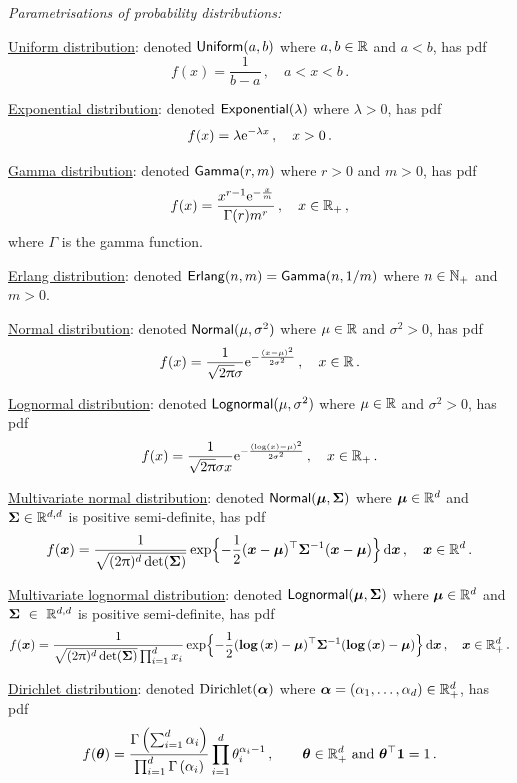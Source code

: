 \emph{Parametrisations of probability distributions:}

\underline{Uniform distribution}: denoted $\mathsf{Uniform}(a,b)$ where $a,b\in\mathbb{R}$ and $a < b$, has pdf
\[ f(x) = \frac{1}{b-a} \,, \quad  a < x < b \,. \]

\underline{Exponential distribution}: denoted $\mathsf{Exponential}(\lambda)$ where $\lambda > 0$, has pdf
\[ f(x) = \lambda \mathrm{e}^{-\lambda x} \,, \quad x > 0 \,. \]

\underline{Gamma distribution}: denoted $\mathsf{Gamma}(r,m)$ where $r > 0$ and $m > 0$, has pdf
\[ f(x) = \frac{x^{r-1}\mathrm{e}^{-\frac{x}{m}}}{\Gamma(r)m^{r}} \,, \quad x \in \mathbb{R}_+\,,\]
where $\Gamma$ is the gamma function.

\underline{Erlang distribution}: denoted $\mathsf{Erlang}(n, m) = \mathsf{Gamma}(n, 1/m)$ where $n \in \mathbb{N}_+$ and $m > 0$.

\underline{Normal distribution}: denoted $\mathsf{Normal}(\mu, \sigma^2)$ where $\mu \in \mathbb{R}$ and $\sigma^2 > 0$, has pdf
\[ f(x) = \frac{1}{\sqrt{2 \uppi} \sigma} \mathrm{e}^{-\frac{(x-\mu)^2}{2 \sigma^2}} \,, \quad x \in \mathbb{R} \,. \]

\underline{Lognormal distribution}: denoted $\mathsf{Lognormal}(\mu, \sigma^2)$ where $\mu \in \mathbb{R}$ and $\sigma^2 > 0$, has pdf
\[ f(x) = \frac{1}{\sqrt{2 \uppi} \sigma x} \mathrm{e}^{-\frac{(\log(x)-\mu)^2}{2 \sigma^2}} \,, \quad x \in \mathbb{R}_+ \,.  \]

\underline{Multivariate normal distribution}: denoted $\mathsf{Normal}(\bm{\mu}, \bm{\Sigma})$ where $\bm{\mu} \in \mathbb{R}^d$ and $\bm{\Sigma} \in \mathbb{R}^{d,d}$ is positive semi-definite, has pdf
\[
  f(\bm{x}) = \frac{1}{\sqrt{(2\uppi)^d \det(\bm{\Sigma})}} \exp\Bigl\{ {-}\frac12 (\bm{x} - \bm{\mu})^\top \bm{\Sigma}^{-1} (\bm{x} - \bm{\mu}) \Bigr\} \mathop{}\!\mathrm{d} \bm{x} \,, \quad \bm{x} \in \mathbb{R}^d \,.
\]

\underline{Multivariate lognormal distribution}: denoted $\mathsf{Lognormal}(\bm{\mu}, \bm{\Sigma})$ where $\bm{\mu} \in \mathbb{R}^d$ and $\bm{\Sigma}~\in~\mathbb{R}^{d,d}$ is positive semi-definite, has pdf
\[ f(\bm{x}) = \frac{1}{\sqrt{(2\uppi)^d \det(\bm{\Sigma})} \prod_{i=1}^d x_i} \exp\Bigl\{ {-}\frac12 ( \text{\bf{log}}\,(\bm{x}) - \bm{\mu} )^\top \bm{\Sigma}^{-1} (\text{\bf{log}}\,(\bm{x}) - \bm{\mu}) \Bigr\} \mathop{}\!\mathrm{d} \bm{x} \,, \quad \bm{x} \in \mathbb{R}_+^d \,. \]

\underline{Dirichlet distribution}: denoted $\mathrm{Dirichlet}(\bm{\alpha})$ where $\bm{\alpha}=(\alpha_1,\dots,\alpha_d) \in \mathbb{R}_+^d$, has pdf
\[
f(\bm{\theta}) = \frac{\Gamma\left(\sum_{i=1}^d \alpha_i\right)}{\prod_{i=1}^d \Gamma\left(\alpha_i \right)} \prod_{i=1}^d \theta_i^{\alpha_i-1} \,,\qquad \bm{\theta} \in \mathbb{R}_+^d \text{ and } \bm{\theta}^\top\bm{1} = 1  \,.
\]

